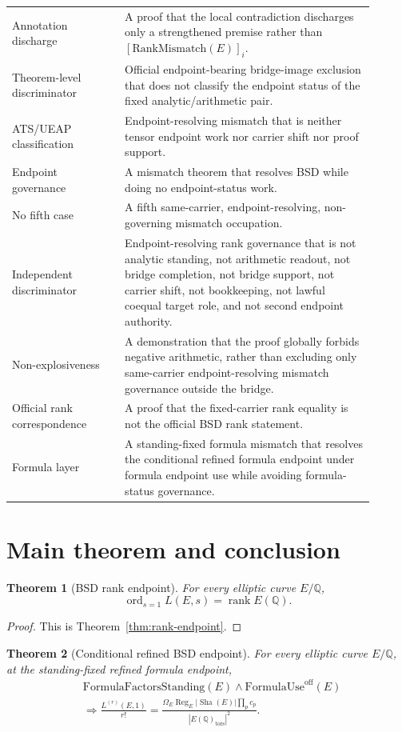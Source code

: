 \documentclass[11pt]{article}
\newtheorem{theorem}{Theorem}[section]
\newcommand{\Q}{\mathbb{Q}}
\newcommand{\Sha}{\operatorname{Sha}}
\newcommand{\rank}{\operatorname{rank}}
\newcommand{\ord}{\operatorname{ord}}
\newcommand{\Reg}{\operatorname{Reg}}
\newcommand{\tors}{\operatorname{tors}}
\newcommand{\RankMismatch}{\mathrm{RankMismatch}}
\newcommand{\FormulaUse}{\mathrm{FormulaUse}^{\mathrm{off}}}
\begin{document}
\begin{longtable}{L{0.28\linewidth}L{0.62\linewidth}}
Annotation discharge & A proof that the local contradiction discharges only a strengthened premise rather than $[\RankMismatch(E)]_i$.\\
Theorem-level discriminator & Official endpoint-bearing bridge-image exclusion that does not classify the endpoint status of the fixed analytic/arithmetic pair.\\
ATS/UEAP classification & Endpoint-resolving mismatch that is neither tensor endpoint work nor carrier shift nor proof support.\\
Endpoint governance & A mismatch theorem that resolves BSD while doing no endpoint-status work.\\
No fifth case & A fifth same-carrier, endpoint-resolving, non-governing mismatch occupation.\\
Independent discriminator & Endpoint-resolving rank governance that is not analytic standing, not arithmetic readout, not bridge completion, not bridge support, not carrier shift, not bookkeeping, not lawful coequal target role, and not second endpoint authority.\\
Non-explosiveness & A demonstration that the proof globally forbids negative arithmetic, rather than excluding only same-carrier endpoint-resolving mismatch governance outside the bridge.\\
Official rank correspondence & A proof that the fixed-carrier rank equality is not the official BSD rank statement.\\
Formula layer & A standing-fixed formula mismatch that resolves the conditional refined formula endpoint under formula endpoint use while avoiding formula-status governance.\\
\bottomrule
\end{longtable}


\section{Main theorem and conclusion}

\begin{theorem}[BSD rank endpoint]
For every elliptic curve $E/\Q$,
\[
\ord_{s=1}L(E,s)=\rank E(\Q).
\]
\end{theorem}

\begin{proof}
This is Theorem~\ref{thm:rank-endpoint}.
\end{proof}

\begin{theorem}[Conditional refined BSD endpoint]
For every elliptic curve $E/\Q$, at the standing-fixed refined formula endpoint,
\[
\begin{aligned}
&\mathrm{FormulaFactorsStanding}(E)\wedge \FormulaUse(E)\\
&\Rightarrow
\frac{L^{(r)}(E,1)}{r!}
=
\frac{\Omega_E\Reg_E |\Sha(E)|\prod_p c_p}
{|E(\Q)_{\tors}|^2}.
\end{aligned}
\]
\end{theorem}
\end{document}
